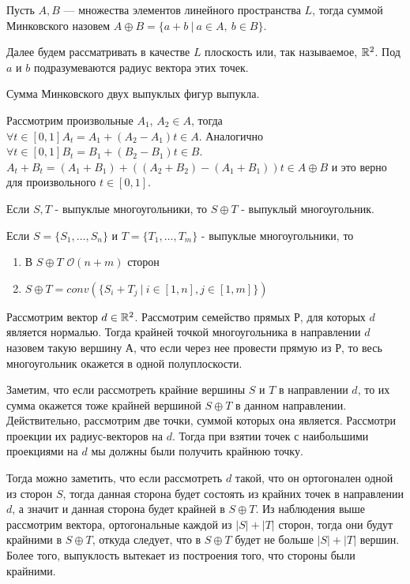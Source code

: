 \Def Пусть $A, B$ — множества элементов линейного пространства $L$, тогда суммой Минковского назовем $A \oplus B = \{a + b \ |\  a \in A, \ b \in B\}$.

Далее будем рассматривать в качестве $L$ плоскость или, так
называемое, $\mathbb{R}^2$. Под $a$ и $b$ подразумеваются радиус вектора этих точек.\newline

\Statement Сумма Минковского двух выпуклых фигур выпукла.

\Proof Рассмотрим произвольные $A_1$, $A_2 \in A$, тогда $\forall t \in [0, 1] A_t = A_1 + (A_2 - A_1)t \in A$.\newline
Аналогично $\forall t \in [0, 1] B_t = B_1 + (B_2 - B_1)t \in B$. \newline
$A_t + B_t = (A_1 + B_1) + ((A_2 + B_2) - (A_1 + B_1))t \in A \oplus B$ и это верно для произвольного $t \in [0, 1]$.\newline

\Statement Если $S, T$ - выпуклые многоугольники, то $S \oplus T$ - выпуклый многоугольник.

\Statement Если $S = \{S_1, \dots, S_n\}$ и $T = \{T_1, \dots, T_m\}$ - выпуклые многоугольники, то \begin{enumerate}
    \item В $S \oplus T$ $\mathcal{O}(n+m)$ сторон
    \item $S \oplus T = conv(\{ S_i + T_j \ | \ i \in [1, n], j\in [1, m]\})$
\end{enumerate}

\Proof Рассмотрим вектор $d \in \mathbb{R}^2$. Рассмотрим семейство прямых Р, для которых $d$ является нормалью. Тогда крайней точкой многоугольника в направлении $d$ назовем такую вершину $А$, что если через нее провести прямую из Р, то весь многоугольник окажется в одной полуплоскости.

Заметим, что если рассмотреть крайние вершины $S$ и $T$ в направлении $d$, то их сумма окажется тоже крайней вершиной $S \oplus T$ в данном направлении. Действительно, рассмотрим две точки, суммой которых она является. Рассмотри проекции их радиус-векторов на $d$. Тогда при взятии точек с наибольшими проекциями на $d$ мы должны были получить крайнюю точку.

Тогда можно заметить, что если рассмотреть $d$ такой, что он ортогонален одной из сторон $S$, тогда
данная сторона будет состоять из крайних точек в направлении $d$, а значит и данная сторона будет крайней в $S \oplus T$.
Из наблюдения выше рассмотрим вектора, ортогональные каждой из $|S| + |T|$ сторон, тогда они будут крайними в $S \oplus T$, откуда следует, что в $S \oplus T$ будет не больше $|S| + |T|$ вершин. Более того, выпуклость вытекает из построения того, что стороны были крайними.

